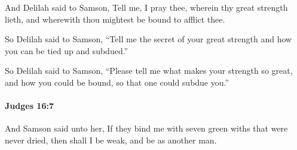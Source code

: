 			\begin{versebox}
					\item[BHS] 
					\item[ASV] And Delilah said to Samson, Tell me, I pray thee, wherein thy great strength lieth, and wherewith thou mightest be bound to afflict thee.
					\item[NIV] So Delilah said to Samson, “Tell me the secret of your great strength and how you can be tied up and subdued.”
					\item[NRSV] So Delilah said to Samson, “Please tell me what makes your strength so great, and how you could be bound, so that one could subdue you.”
			\end{versebox}

		\paragraph{Judges 16:7} %
			\label{JUDGES-16-7}

			And Samson said unto her, If they bind me with seven green withs that were never dried, then shall I be weak, and be as another man.

